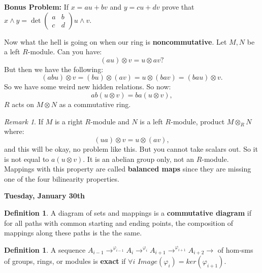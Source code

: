 \documentclass[12pt]{amsbook}
\theoremstyle{plain}
\numberwithin{section}{chapter}
\numberwithin{equation}{chapter}
\theoremstyle{definition}
\newtheorem{Def}[theorem]{Definition}
\theoremstyle{remark}
\newtheorem{rem}[theorem]{Remark}
\newcommand{\tens}{\otimes}
\renewcommand{\phi}{\varphi}
\begin{document}
\textbf{Bonus Problem: } If $x= au + bv$ and $y = cu + dv$ prove that $x \wedge y = \det \left(\begin{matrix}
a & b\\
c & d
\end{matrix}\right) u \wedge v$. 

Now what the hell is going on when our ring is \textbf{noncommutative}. Let $M,N$ be a left $R$-module. Can you have: 
$$
(au) \tens v = u \tens av?
$$
But then we have the following:
$$
(abu) \tens v = (bu) \tens (av) = u \tens (bav) = (bau) \tens v.
$$
So we have some weird new hidden relations. So now:
$$
ab(u \tens v) = ba (u \tens v),
$$
$R$ acts on $M \tens N$ as a commutative ring. 

\begin{rem}
If $M$ is a right $R$-module and $N$ is a left $R$-module, product $M \tens_R N$ where:
$$
(ua) \tens v = u \tens (av),
$$ and this will be okay, no problem like this. But you cannot take scalars out. So it is not equal to $a(u \tens v)$. It is an abelian group only, not an $R$-module. Mappings with this property are called \textbf{balanced maps} since they are missing one of the four bilinearity properties. 
\end{rem}

\textbf{Tuesday, January 30th}

\begin{Def}
A diagram of sets and mappings is a \textbf{commutative diagram} if for all paths with common starting and ending points, the composition of mappings along these paths is the the same. 
\end{Def}

\begin{center}
\end{center}

\begin{Def}
A sequence $A_{i -1} \rightarrow^{\phi_{i - 1}} A_i\rightarrow^{\phi_{i}} A_{i + 1} \rightarrow^{\phi_{i + 1}} A_{i + 2} \rightarrow$ of hom-sms of groups, rings, or modules is \textbf{exact} if $\forall i$ $Image(\phi_i) = ker(\phi_{i  +1})$. 
\end{Def}
\end{document}
